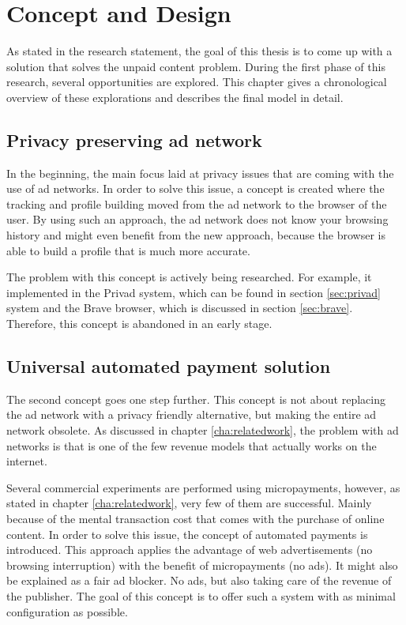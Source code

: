 \chapter{Concept and Design}
\label{cha:conceptanddesign}

As stated in the research statement, the goal of this thesis is to come up with a solution that solves the unpaid content problem. During the first phase of this research, several opportunities are explored. This chapter gives a chronological overview of these explorations and describes the final model in detail.

\section{Privacy preserving ad network}
In the beginning, the main focus laid at privacy issues that are coming with the use of ad networks. In order to solve this issue, a concept is created where the tracking and profile building moved from the ad network to the browser of the user. By using such an approach, the ad network does not know your browsing history and might even benefit from the new approach, because the browser is able to build a profile that is much more accurate. 

The problem with this concept is actively being researched. For example, it implemented in the Privad system, which can be found in section \ref{sec:privad} system and the Brave browser, which is discussed in section \ref{sec:brave}. Therefore, this concept is abandoned in an early stage.

\section{Universal automated payment solution}
The second concept goes one step further. This concept is not about replacing the ad network with a privacy friendly alternative, but making the entire ad network obsolete. As discussed in chapter \ref{cha:relatedwork}, the problem with ad networks is that is one of the few revenue models that actually works on the internet.

Several commercial experiments are performed using micropayments, however, as stated in chapter \ref{cha:relatedwork}, very few of them are successful. Mainly because of the mental transaction cost that comes with the purchase of online content. In order to solve this issue, the concept of automated payments is introduced. This approach applies the advantage of web advertisements (no browsing interruption) with the benefit of micropayments (no ads). It might also be explained as a fair ad blocker. No ads, but also taking care of the revenue of the publisher. The goal of this concept is to offer such a system with as minimal configuration as possible.

